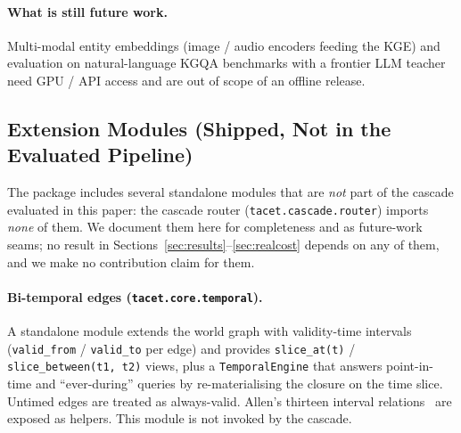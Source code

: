 \documentclass[11pt]{article}
\theoremstyle{plain}
\begin{document}
\paragraph{What is still future work.}
Multi-modal entity embeddings (image / audio encoders feeding the KGE) and
evaluation on natural-language KGQA benchmarks with a frontier LLM
teacher need GPU / API access and are out of scope of an offline release.

\subsection{Extension Modules (Shipped, Not in the Evaluated Pipeline)}
\label{sec:extmodules}

The package includes several standalone modules that are \emph{not}
part of the cascade evaluated in this paper: the cascade router
(\texttt{tacet.cascade.router}) imports \emph{none} of them. We document them
here for completeness and as future-work seams; no result in
Sections~\ref{sec:results}--\ref{sec:realcost} depends on any of them, and we
make no contribution claim for them.

\paragraph{Bi-temporal edges (\texttt{tacet.core.temporal}).}
A standalone module extends the world graph with validity-time intervals
(\texttt{valid\_from} / \texttt{valid\_to} per edge) and provides
\texttt{slice\_at(t)} / \texttt{slice\_between(t1, t2)} views, plus a
\texttt{TemporalEngine} that answers point-in-time and ``ever-during'' queries
by re-materialising the closure on the time slice. Untimed edges are treated
as always-valid. Allen's thirteen interval
relations~\citep{allen1983temporal} are exposed as helpers. This module is not
invoked by the cascade.
\end{document}
